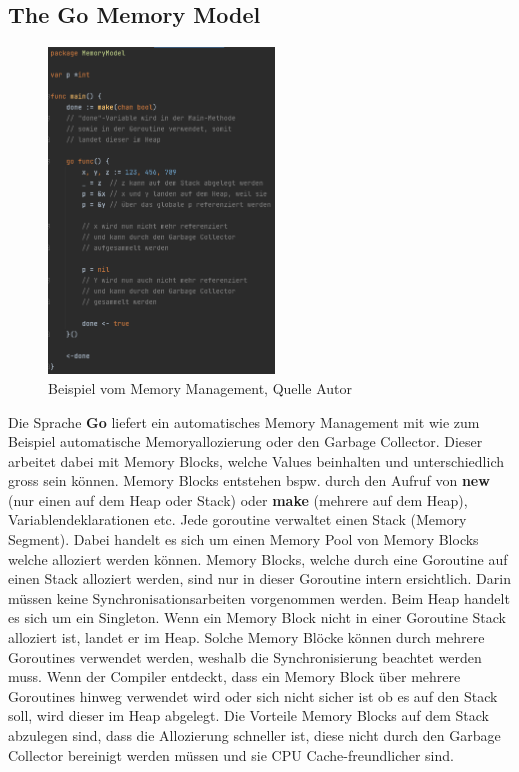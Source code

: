 \documentclass[12pt,titlepage]{article}
\begin{document}
\subsection{The Go Memory Model}
\begin{figure}
	\centering
	\includegraphics[width=6cm]{memorymodel}
	\caption{Beispiel vom Memory Management, Quelle Autor}\label{memorymodel}
\end{figure}
Die Sprache \textbf{Go} liefert ein automatisches Memory Management mit wie zum Beispiel automatische Memoryallozierung oder den Garbage Collector.
Dieser arbeitet dabei mit Memory Blocks, welche Values beinhalten und unterschiedlich gross sein können.
Memory Blocks entstehen bspw. durch den Aufruf von \textbf{new} (nur einen auf dem Heap oder Stack) oder \textbf{make} (mehrere auf dem Heap), Variablendeklarationen etc.
Jede goroutine verwaltet einen Stack (Memory Segment).
Dabei handelt es sich um einen Memory Pool von Memory Blocks welche alloziert werden können.
Memory Blocks, welche durch eine Goroutine auf einen Stack alloziert werden, sind nur in dieser Goroutine intern ersichtlich.
Darin müssen keine Synchronisationsarbeiten vorgenommen werden.
Beim Heap handelt es sich um ein Singleton.
Wenn ein Memory Block nicht in einer Goroutine Stack alloziert ist, landet er im Heap.
Solche Memory Blöcke können durch mehrere Goroutines verwendet werden, weshalb die Synchronisierung beachtet werden muss.
Wenn der Compiler entdeckt, dass ein Memory Block über mehrere Goroutines hinweg verwendet wird oder sich nicht sicher ist ob es auf den Stack soll, wird dieser im Heap abgelegt.
Die Vorteile Memory Blocks auf dem Stack abzulegen sind, dass die Allozierung schneller ist, diese nicht durch den Garbage Collector bereinigt werden müssen und sie CPU Cache-freundlicher sind.
\end{document}
